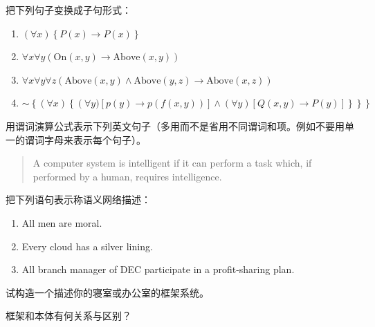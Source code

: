 \begin{question}
把下列句子变换成子句形式：
	\begin{enumerate}
         \item $\left(\forall x\right) \left\{P\left(x\right) \to P\left(x\right)\right\}$
         \item $\forall x \forall y \left(\mathrm{On} \left(x,y\right) \to \mathrm{Above} \left(x,y\right) \right)$
         \item $\forall x \forall y \forall z \left(\mathrm{Above} \left(x,y\right) \wedge \mathrm{Above}\left(y,z\right) \to \mathrm{Above}\left(x,z\right) \right)$ 
         \item $\sim\left\{\left(\forall x\right)\left\{\left(\forall y)\left[p\left(y\right) \to p(f(x,y))\right] \wedge \left(\forall y \right) \left[Q(x,y) \to P(y) \right]\right\}\right\}\right\}$
	\end{enumerate}
\end{question}
\begin{solution}
\end{solution}

\begin{question}
用谓词演算公式表示下列英文句子（多用而不是省用不同谓词和项。例如不要用单一的谓词字母来表示每个句子）。
	\begin{quote}
		A computer system is intelligent if it can perform a task which, if performed by a human, requires intelligence. 
	\end{quote}
\end{question}
\begin{solution}
\end{solution}

\begin{question}
把下列语句表示称语义网络描述：
	\begin{enumerate}
		\item All men are moral.
		\item Every cloud has a silver lining.
		\item All branch manager of DEC participate in a profit-sharing plan. 
	\end{enumerate}
\end{question}
\begin{solution}
\end{solution}

\begin{question}
试构造一个描述你的寝室或办公室的框架系统。
\end{question}
\begin{solution}
\end{solution}

\begin{question}
框架和本体有何关系与区别？
\end{question}
\begin{solution}
\end{solution}